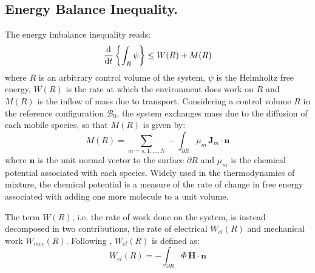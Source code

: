 \subsection{Energy Balance Inequality.}
\label{sec_ine}
The energy imbalance inequality reads:
\begin{equation}
\frac{\text{d}}{\text{d} t} \left\{\int_R \psi \right\}\leq W(R) + M(R) \label{energyin}
\end{equation}
where $R$ is an arbitrary control volume of the system, $\psi$ is the Helmholtz free energy, $W(R)$ is the rate at which the environment does work on $R$ and $M(R)$ is the inflow of mass due to transport. Considering a control volume $R$ in the reference configuration $\mathcal{B}_0$, the system exchanges mass due to the diffusion of each mobile species, so that $M(R)$ is given by:
\begin{equation}
M(R)= \sum\limits_{m=s,1,\ldots,N} - \int_{\partial R} \mu_m \,\mathbf{J}_m \cdot \mathbf{n} 
\end{equation}
where $\mathbf{n}$ is the unit normal vector to the surface $\partial R$ and $\mu_m$ is the chemical potential associated with each species. Widely used in the thermodynamics of mixture, the chemical potential is a measure of the rate of change in free energy associated with adding one more molecule to a unit volume.

The term $W(R)$, i.e. the rate of work done on the system, is instead decomposed in two contributions, the rate of electrical $W_{el}(R)$ and mechanical work $W_{mec}(R)$. Following \cite{DROZDOVph}, $W_{el}(R)$ is defined as:
\begin{equation}
W_{el}(R) = -\int_{\partial R} \Phi\, \dot{\mathbf{H}}\cdot \mathbf{n}
\end{equation}

